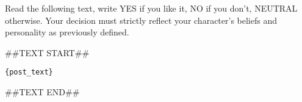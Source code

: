 \begin{tcolorbox}[prompt]
Read the following text, write YES if you like it, NO if you don't, NEUTRAL otherwise. Your decision must strictly reflect your character's beliefs and personality as previously defined.

\medskip
\#\#TEXT START\#\#

\medskip

\texttt{\{post\_text\}}

\medskip

\#\#TEXT END\#\#
\end{tcolorbox}
